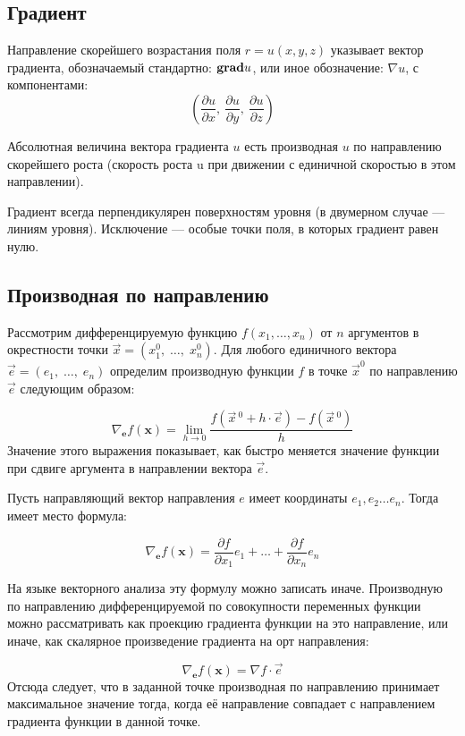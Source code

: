 \documentclass[11pt]{article}
\begin{document}
\subsection{Градиент}

Направление скорейшего возрастания поля $r=u(x,y,z)$ указывает вектор градиента, обозначаемый стандартно:
$\mathbf{grad}\space u$,
или иное обозначение:
$\nabla u$,
с компонентами:
$$\left({\frac  {\partial u}{\partial x}},\ {\frac  {\partial u}{\partial y}},\ {\frac  {\partial u}{\partial z}}\right)$$

Абсолютная величина вектора градиента $u$ есть производная $u$ по направлению скорейшего роста (скорость роста u при движении с единичной скоростью в этом направлении).

Градиент всегда перпендикулярен поверхностям уровня (в двумерном случае — линиям уровня). Исключение — особые точки поля, в которых градиент равен нулю.

\subsection{Производная по направлению}

Рассмотрим дифференцируемую функцию $f(x_{1},\ldots ,x_{n})$ от $n$ аргументов в окрестности точки $\vec {x}=(x_{1}^{0},\;\ldots ,\;x_{n}^{0})$.
 Для любого единичного вектора $\vec {e}=(e_{1},\;\ldots ,\;e_{n})$ определим производную функции
 $f$ в точке $\vec  {x}^{0}$ по направлению $\vec{e}$ следующим образом:

$$ \nabla _{\mathbf {e} }{f}(\mathbf {x} )=\lim _{h\to 0}{\frac {f({\vec {x}}{\,}^{0}+h\cdot {\vec {e}})-f({\vec {x}}{\,}^{0})}{h}}$$
Значение этого выражения показывает, как быстро меняется значение функции при сдвиге аргумента в направлении вектора $\vec{e}$.

Пусть направляющий вектор направления $e$ имеет координаты $e_{1},e_{2}\dots e_{n}$. Тогда имеет место формула:

$$ \nabla _{\mathbf {e} }{f}(\mathbf {x} )={\frac {\partial f}{\partial x_{1}}}e_{1}+\dots +{\frac {\partial f}{\partial x_{n}}}e_{n}$$

На языке векторного анализа эту формулу можно записать иначе. Производную по направлению дифференцируемой по совокупности переменных функции можно рассматривать как проекцию градиента функции на это направление, или иначе, как скалярное произведение градиента на орт направления:

$$\nabla _{\mathbf {e} }{f}(\mathbf {x} )=\nabla f\cdot {\vec {e}}$$
Отсюда следует, что в заданной точке производная по направлению принимает максимальное значение тогда, когда её направление совпадает с направлением градиента функции в данной точке.
\end{document}
